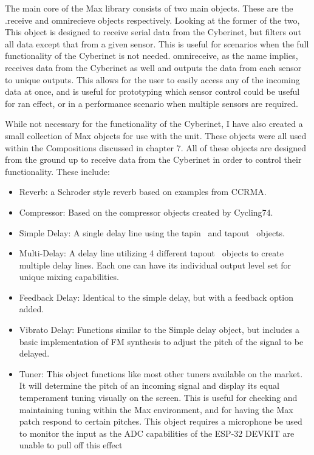 The main core of the Max library consists of two main objects. These are the .receive and omnirecieve objects respectively. Looking at the former of the two, This object is designed to receive serial data from the Cyberinet, but filters out all data except that from a given sensor. This is useful for scenarios when the full functionality of the Cyberinet is not needed. omnireceive, as the name implies, receives data from the Cyberinet as well and outputs the data from each sensor to unique outputs. This allows for the user to easily access any of the incoming data at once, and is useful for prototyping which sensor control could be useful for ran effect, or in a performance scenario when multiple sensors are required.

While not necessary for the functionality of the Cyberinet, I have also created a small collection of Max objects for use with the unit. These objects were all used within the Compositions discussed in chapter 7. All of these objects are designed from the ground up to receive data from the Cyberinet in order to control their functionality. These include:

\begin{itemize}
    \item Reverb: a Schroder style reverb based on examples from CCRMA.
    \item Compressor: Based on the compressor objects created by Cycling74.
    \item Simple Delay: A single delay line using the tapin~ and tapout~ objects. 
    \item Multi-Delay: A delay line utilizing 4 different tapout~ objects to create multiple delay lines. Each one can have its individual output level set for unique mixing capabilities.
    \item Feedback Delay: Identical to the simple delay, but with a feedback option added.
    \item Vibrato Delay: Functions similar to the Simple delay object, but includes a basic implementation of FM synthesis to adjust the pitch of the signal to be delayed. 
    \item Tuner: This object functions like most other tuners available on the market. It will determine the pitch of an incoming signal and display its equal temperament tuning visually on the screen. This is useful for checking and maintaining tuning within the Max environment, and for having the Max patch respond to certain pitches. This object requires a microphone be used to monitor the input as the ADC capabilities of the ESP-32 DEVKIT are unable to pull off this effect
\end{itemize}


